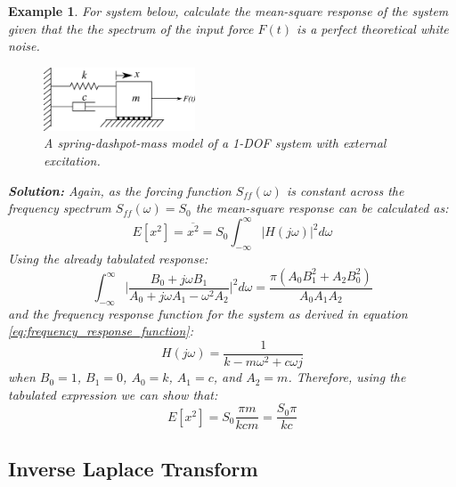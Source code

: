 \documentclass[12pt,letter]{article}
\newtheorem{ex}{Example}
\numberwithin{ex}{section} %
\newenvironment{example}{\begin{mdframed}[middlelinewidth=0.5mm]\begin{ex}\normalfont}{\end{ex}\end{mdframed}}
\numberwithin{re}{section} %
\numberwithin{equation}{section}	%
\begin{document}
\begin{example}
	For system below, calculate the mean-square response of the system given that the the spectrum of the input force $F(t)$ is a perfect theoretical white noise.
	\begin{figure}[H]
		\centering
		\includegraphics[width=0.4\textwidth]{../figures/1-DOF-spring_dashpot_mass_horizontal_forced.png}
		\caption{A spring-dashpot-mass model of a 1-DOF system with external excitation.}
	\end{figure}
	\noindent\textbf{Solution:} Again, as the forcing function $S_{ff}(\omega)$ is constant across the frequency spectrum $S_{ff}(\omega)=S_0$ the mean-square response can be calculated as:
	\begin{equation}
		E[x^2] = \overline{x^2} =   S_{0} \int_{-\infty}^{\infty} |H(j\omega)|^2 d\omega
	\end{equation}
	Using the already tabulated response:
	\begin{equation}
		\int_{-\infty}^{\infty} \bigg|\frac{B_0 + j \omega B_1}{A_0+j \omega A_1 - \omega^2 A_2} \bigg|^2 d\omega = \frac{\pi (A_0 B_1^2 + A_2 B_0^2)}{A_0 A_1 A_2}
	\end{equation} 
	and the frequency response function for the system as derived in equation \ref{eq:frequency_response_function}:
	\begin{equation}
		H(j\omega) = \frac{1}{k-m\omega^2+c\omega j}
	\end{equation}
	when $B_0=1$, $B_1 = 0$, $A_0=k$, $A_1=c$, and $A_2 =m$. Therefore, using the tabulated expression we can show that:
	\begin{equation}
		E[x^2] = S_0 \frac{\pi m }{k c m} =  \frac{S_0 \pi}{k c}
	\end{equation} 
\end{example}			
			

\subsection{Inverse Laplace Transform} 
\end{document}
